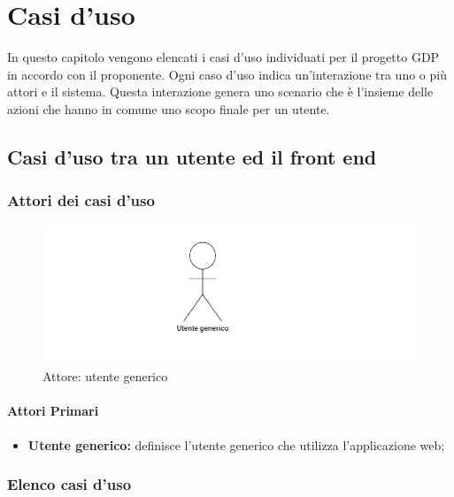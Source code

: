\chapter{Casi d'uso}\label{casiDuso}
In questo capitolo vengono elencati i casi d'uso individuati per il progetto GDP in accordo con il proponente. Ogni caso d'uso indica un'interazione tra uno o più attori e il sistema. Questa interazione genera uno scenario che è l'insieme delle azioni che hanno in comune uno scopo finale per un utente.

\section{Casi d'uso tra un utente ed il front end}
\subsection{Attori dei casi d'uso}
\begin{center}
	\begin{figure}[H]
		\includegraphics{../immagini/attori_casi/utente_generico.png}
		\caption{Attore: utente generico}
	\end{figure}
\end{center}
\subsubsection{Attori Primari}\label{UFattoriPrimari}
\begin{itemize}
	\item \textbf{Utente generico:} definisce l'utente generico che utilizza l'applicazione web;
\end{itemize}

\subsection{Elenco casi d'uso}\label{UFelencoCasiDuso}

